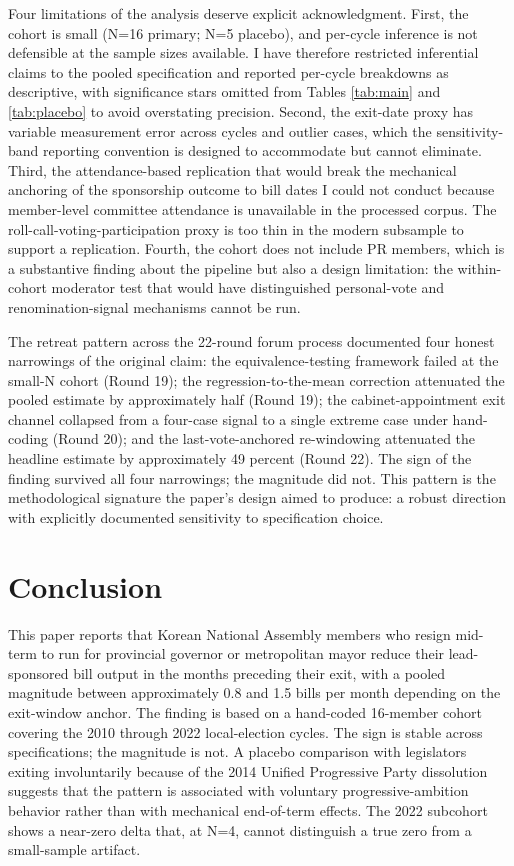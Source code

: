 \documentclass[11pt]{article}
\begin{document}
Four limitations of the analysis deserve explicit acknowledgment. First, the cohort is small (N=16 primary; N=5 placebo), and per-cycle inference is not defensible at the sample sizes available. I have therefore restricted inferential claims to the pooled specification and reported per-cycle breakdowns as descriptive, with significance stars omitted from Tables \ref{tab:main} and \ref{tab:placebo} to avoid overstating precision. Second, the exit-date proxy has variable measurement error across cycles and outlier cases, which the sensitivity-band reporting convention is designed to accommodate but cannot eliminate. Third, the attendance-based replication that would break the mechanical anchoring of the sponsorship outcome to bill dates I could not conduct because member-level committee attendance is unavailable in the processed corpus. The roll-call-voting-participation proxy is too thin in the modern subsample to support a replication. Fourth, the cohort does not include PR members, which is a substantive finding about the pipeline but also a design limitation: the within-cohort moderator test that would have distinguished personal-vote and renomination-signal mechanisms cannot be run.

The retreat pattern across the 22-round forum process documented four honest narrowings of the original claim: the equivalence-testing framework failed at the small-N cohort (Round 19); the regression-to-the-mean correction attenuated the pooled estimate by approximately half (Round 19); the cabinet-appointment exit channel collapsed from a four-case signal to a single extreme case under hand-coding (Round 20); and the last-vote-anchored re-windowing attenuated the headline estimate by approximately 49 percent (Round 22). The sign of the finding survived all four narrowings; the magnitude did not. This pattern is the methodological signature the paper's design aimed to produce: a robust direction with explicitly documented sensitivity to specification choice.

\section{Conclusion}

This paper reports that Korean National Assembly members who resign mid-term to run for provincial governor or metropolitan mayor reduce their lead-sponsored bill output in the months preceding their exit, with a pooled magnitude between approximately 0.8 and 1.5 bills per month depending on the exit-window anchor. The finding is based on a hand-coded 16-member cohort covering the 2010 through 2022 local-election cycles. The sign is stable across specifications; the magnitude is not. A placebo comparison with legislators exiting involuntarily because of the 2014 Unified Progressive Party dissolution suggests that the pattern is associated with voluntary progressive-ambition behavior rather than with mechanical end-of-term effects. The 2022 subcohort shows a near-zero delta that, at N=4, cannot distinguish a true zero from a small-sample artifact.
\end{document}
